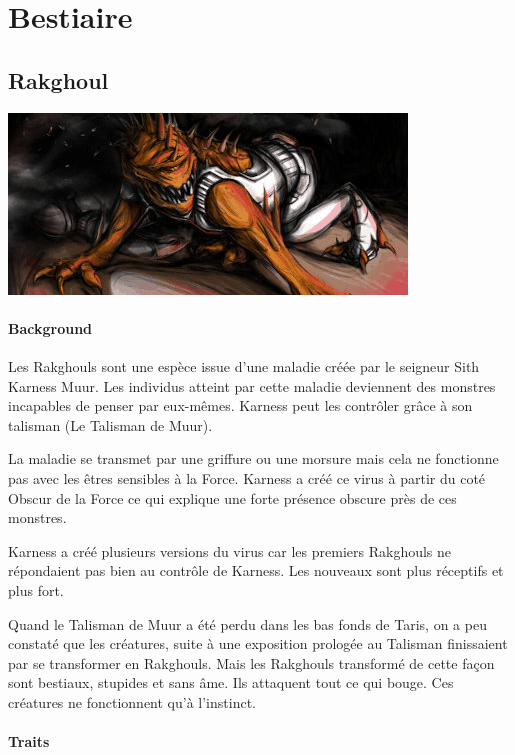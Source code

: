 \section{Bestiaire}\label{sec:bestiaire}

\subsection{Rakghoul}
\label{sec:rakghoul}
\noindent\includegraphics[width=\linewidth]{_img/bestiary/rakghoul.jpg}

\paragraph{Background}
Les Rakghouls sont une espèce issue d’une maladie créée par le seigneur Sith Karness Muur. Les individus atteint par cette maladie deviennent des monstres incapables de penser par eux-mêmes. Karness peut les contrôler grâce à son talisman (Le Talisman de Muur).

La maladie se transmet par une griffure ou une morsure mais cela ne fonctionne pas avec les êtres sensibles à la Force. Karness a créé ce virus à partir du coté Obscur de la Force ce qui explique une forte présence obscure près de ces monstres.

Karness a créé plusieurs versions du virus car les premiers Rakghouls ne répondaient pas bien au contrôle de Karness. Les nouveaux sont plus réceptifs et plus fort.

Quand le Talisman de Muur a été perdu dans les bas fonds de Taris, on a peu constaté que les créatures, suite à une exposition prologée au Talisman finissaient par se transformer en Rakghouls. Mais les Rakghouls transformé de cette façon sont bestiaux, stupides et sans âme. Ils attaquent tout ce qui bouge. Ces créatures ne fonctionnent qu’à l’instinct.

\paragraph{Traits}

